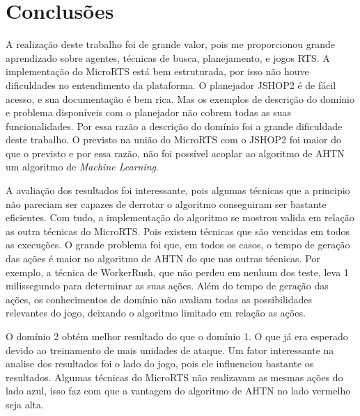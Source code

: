 
\chapter{\label{chap:concl}Conclusões}

A realização deste trabalho foi de grande valor, pois me proporcionou grande aprendizado sobre agentes, técnicas de busca, planejamento, e jogos RTS.
A implementação do MicroRTS está bem estruturada, por isso não houve dificuldades no entendimento da plataforma.
O planejador JSHOP2 é de fácil acesso, e sua documentação é bem rica.
Mas os exemplos de descrição do domínio e problema disponíveis com o planejador não cobrem todas as suas funcionalidades.
Por essa razão a descrição do domínio foi a grande dificuldade deste trabalho.
O previsto na união do MicroRTS com o JSHOP2 foi maior do que o previsto e por essa razão, não foi possível acoplar ao algoritmo de AHTN um algoritmo de \textit{Machine Learning}.

A avaliação dos resultados foi interessante, pois algumas técnicas que a principio não pareciam ser capazes de derrotar o algoritmo conseguiram ser bastante eficientes.
Com tudo, a implementação do algoritmo se mostrou valida em relação as outra técnicas do MicroRTS.
Pois existem técnicas que são vencidas em todos as execuções.
O grande problema foi que, em todos os casos, o tempo de geração das ações é maior no algoritmo de AHTN do que nas outras técnicas.
Por exemplo, a técnica de WorkerRush, que não perdeu em nenhum dos teste, leva 1 milissegundo para determinar as suas ações.
Além do tempo de geração das ações, os conhecimentos de domínio não avaliam todas as possibilidades relevantes do jogo, deixando o algoritmo limitado em relação as ações.

O domínio 2 obtém melhor resultado do que o domínio 1.
O que já era esperado devido ao treinamento de mais unidades de ataque.
Um fator interessante na analise dos resultados foi o lado do jogo, pois ele influenciou bastante os resultados.
Algumas técnicas do MicroRTS não realizavam as mesmas ações do lado azul, isso faz com que a vantagem do algoritmo de AHTN no lado vermelho seja alta.

